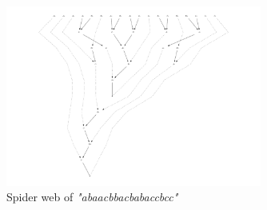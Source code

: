\documentclass[nonatbib,numbers,10pt]{llncs}
\newcommand{\w}[1]{\textit{"#1"}}
\begin{document}
\begin{figure}
\begin{center}
\includegraphics[width=0.75\textwidth]{web.pdf}
\caption{Spider web of \w{abaacbbacbabaccbcc}}
\label{fig:web}
\end{center}
\end{figure}
\end{document}
